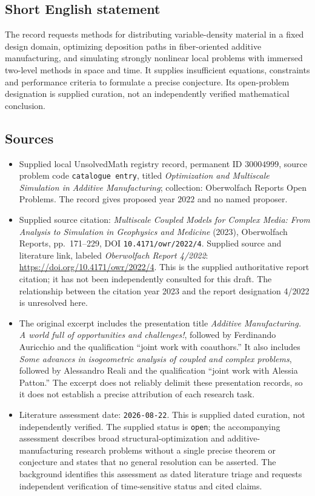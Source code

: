 \documentclass[11pt]{article}
\begin{document}
\subsection{Short English statement}
The record requests methods for distributing variable-density material in a fixed design domain, optimizing deposition paths in fiber-oriented additive manufacturing, and simulating strongly nonlinear local problems with immersed two-level methods in space and time. It supplies insufficient equations, constraints and performance criteria to formulate a precise conjecture. Its open-problem designation is supplied curation, not an independently verified mathematical conclusion.
\subsection{Sources}
\begin{itemize}
\item Supplied local UnsolvedMath registry record, permanent ID \(30004999\), source problem code \texttt{catalogue entry}, titled \emph{Optimization and Multiscale Simulation in Additive Manufacturing}; collection: Oberwolfach Reports Open Problems. The record gives proposed year \(2022\) and no named proposer.
\item Supplied source citation: \emph{Multiscale Coupled Models for Complex Media: From Analysis to Simulation in Geophysics and Medicine} (2023), Oberwolfach Reports, pp.\ 171--229, DOI \texttt{10.4171/owr/2022/4}. Supplied source and literature link, labeled \emph{Oberwolfach Report 4/2022}: \url{https://doi.org/10.4171/owr/2022/4}. This is the supplied authoritative report citation; it has not been independently consulted for this draft. The relationship between the citation year 2023 and the report designation 4/2022 is unresolved here.
\item The original excerpt includes the presentation title \emph{Additive Manufacturing. A world full of opportunities and challenges!}, followed by Ferdinando Auricchio and the qualification ``joint work with coauthors.'' It also includes \emph{Some advances in isogeometric analysis of coupled and complex problems}, followed by Alessandro Reali and the qualification ``joint work with Alessia Patton.'' The excerpt does not reliably delimit these presentation records, so it does not establish a precise attribution of each research task.
\item Literature assessment date: \texttt{2026-08-22}. This is supplied dated curation, not independently verified. The supplied status is \texttt{open}; the accompanying assessment describes broad structural-optimization and additive-manufacturing research problems without a single precise theorem or conjecture and states that no general resolution can be asserted. The background identifies this assessment as dated literature triage and requests independent verification of time-sensitive status and cited claims.

\end{itemize}
\end{document}
